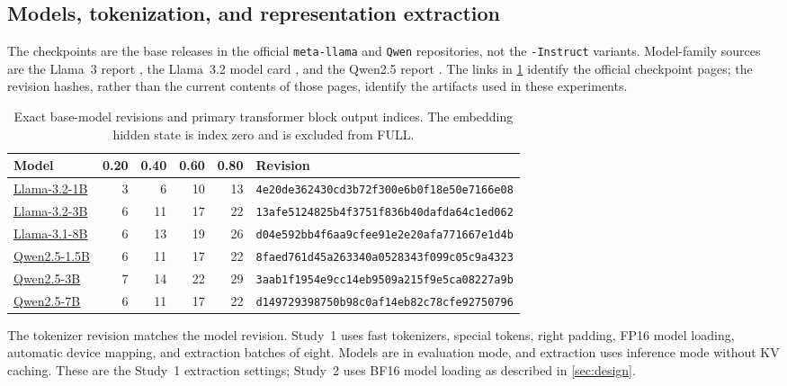 \subsection{Models, tokenization, and representation extraction}

The checkpoints are the base releases in the official
\texttt{meta-llama} and \texttt{Qwen} repositories,
not the \texttt{-Instruct} variants.
Model-family sources are the Llama~3 report
\citep{grattafiori2024llama3}, the Llama~3.2 model card
\citep{meta2024llama32}, and the Qwen2.5 report
\citep{qwen2025technical}.
The links in \cref{tab:models} identify the official checkpoint
pages; the revision hashes, rather than the current contents
of those pages, identify the artifacts used in these experiments.

\begin{table}[H]
\centering
\caption{Exact base-model revisions and primary transformer
block output indices.
The embedding hidden state is index zero and is excluded
from FULL.}
\label{tab:models}
\small
\begin{tabular}{lrrrrl}
\toprule
Model & 0.20 & 0.40 & 0.60 & 0.80 & Revision \\
\midrule
\href{https://huggingface.co/meta-llama/Llama-3.2-1B}{Llama-3.2-1B}
& 3&6&10&13
& \texttt{4e20de362430cd3b72f300e6b0f18e50e7166e08}\\
\href{https://huggingface.co/meta-llama/Llama-3.2-3B}{Llama-3.2-3B}
& 6&11&17&22
& \texttt{13afe5124825b4f3751f836b40dafda64c1ed062}\\
\href{https://huggingface.co/meta-llama/Llama-3.1-8B}{Llama-3.1-8B}
& 6&13&19&26
& \texttt{d04e592bb4f6aa9cfee91e2e20afa771667e1d4b}\\
\href{https://huggingface.co/Qwen/Qwen2.5-1.5B}{Qwen2.5-1.5B}
& 6&11&17&22
& \texttt{8faed761d45a263340a0528343f099c05c9a4323}\\
\href{https://huggingface.co/Qwen/Qwen2.5-3B}{Qwen2.5-3B}
& 7&14&22&29
& \texttt{3aab1f1954e9cc14eb9509a215f9e5ca08227a9b}\\
\href{https://huggingface.co/Qwen/Qwen2.5-7B}{Qwen2.5-7B}
& 6&11&17&22
& \texttt{d149729398750b98c0af14eb82c78cfe92750796}\\
\bottomrule
\end{tabular}
\end{table}

The tokenizer revision matches the model revision.
Study~1 uses fast tokenizers, special tokens, right padding,
FP16 model loading, automatic device mapping, and extraction
batches of eight.
Models are in evaluation mode, and extraction uses inference
mode without KV caching.
These are the Study~1 extraction settings; Study~2 uses BF16
model loading as described in \cref{sec:design}.

